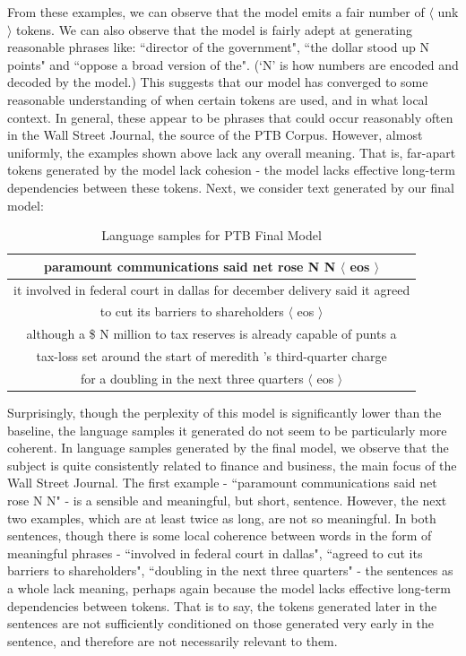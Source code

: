 \documentclass[a4paper]{article}
\begin{document}
From these examples, we can observe that the model emits a fair number of $\langle$ unk $\rangle$ tokens. We can also observe that the model is fairly adept at generating reasonable phrases like: ``director of the government", ``the dollar stood up N points" and ``oppose a broad version of the". (`N' is how numbers are encoded and decoded by the model.) This suggests that our model has converged to some reasonable understanding of when certain tokens are used, and in what local context. In general, these appear to be phrases that could occur reasonably often in the Wall Street Journal, the source of the PTB Corpus. However, almost uniformly, the examples shown above lack any overall meaning. That is, far-apart tokens generated by the model lack cohesion - the model lacks effective long-term dependencies between these tokens.
\newline
\newline
Next, we consider text generated by our final model:

\begin{table}[h]
\centering
\begin{tabular}{|c|} \hline
paramount communications said net rose N N $\langle$ eos $\rangle$ \\ \hline
it involved in federal court in dallas for december delivery said it agreed \\
to cut its barriers to shareholders $\langle$ eos $\rangle$ \\ \hline
although a \$ N million to tax reserves is already capable of punts a \\ 
tax-loss set around the start of meredith 's third-quarter charge \\
for a doubling in the next three quarters $\langle$ eos $\rangle$  \\ \hline
\end{tabular}
\caption{Language samples for PTB Final Model}
\label{table:1}
\end{table}

Surprisingly, though the perplexity of this model is significantly lower than the baseline, the language samples it generated do not seem to be particularly more coherent. In language samples generated by the final model, we observe that the subject is quite consistently related to finance and business, the main focus of the Wall Street Journal. The first example - ``paramount communications said net rose N N" - is a sensible and meaningful, but short, sentence. However, the next two examples, which are at least twice as long, are not so meaningful. In both sentences, though there is some local coherence between words in the form of meaningful phrases - ``involved in federal court in dallas", ``agreed to cut its barriers to shareholders", ``doubling in the next three quarters" - the sentences as a whole lack meaning, perhaps again because the model lacks effective long-term dependencies between tokens. That is to say, the tokens generated later in the sentences are not sufficiently conditioned on those generated very early in the sentence, and therefore are not necessarily relevant to them.
\end{document}
